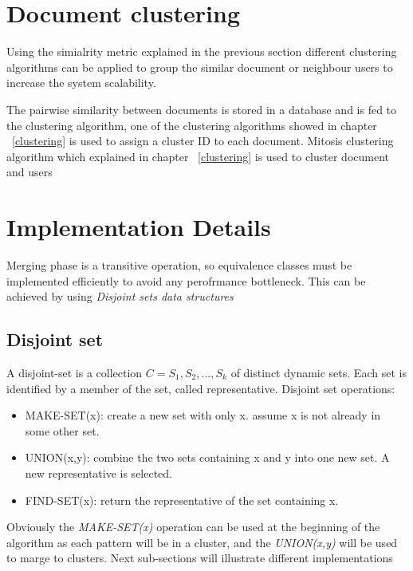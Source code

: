 \section{Document clustering}
Using the simialrity metric explained in the previous section different clustering algorithms can be applied to group the similar document or neighbour users to increase the system scalability.

The pairwise similarity between documents is stored in a database and is fed to the clustering algorithm, one of the clustering algorithms showed in chapter ~\ref{clustering} is used to assign a cluster ID to each document.
Mitosis clustering algorithm which explained in chapter ~\ref{clustering} is used to cluster document and users
\section{Implementation Details}
Merging phase is a transitive operation, so equivalence classes must be implemented efficiently to avoid any perofrmance bottleneck.
This can be achieved by using \textit{Disjoint sets data structures}
\subsection{Disjoint set}

A disjoint-set is a collection $C={S_1, S_2,..., S_k}$ of distinct dynamic sets.
Each set is identified by a member of the set, called representative.
Disjoint set operations:
\begin{itemize}
\item MAKE-SET(x): create a new set with only x. assume x is not already in some other set.
\item UNION(x,y): combine the two sets containing x and y into one new set. A new representative is selected.
\item FIND-SET(x): return the representative of the set containing x.
\end{itemize}
Obviously the \textit{MAKE-SET(x)} operation can be used at the beginning of the algorithm as each pattern will be in a cluster, and the \textit{UNION(x,y)} will be used to marge to clusters.
Next sub-sections will illustrate different implementations
